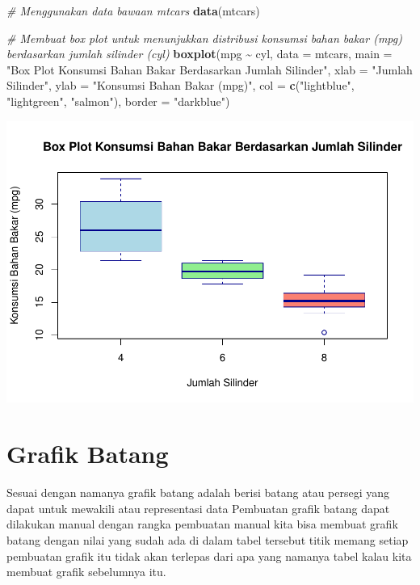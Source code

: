 \documentclass[
]{book}
\newenvironment{Shaded}{\begin{snugshade}}{\end{snugshade}}
\newcommand{\AttributeTok}[1]{\textcolor[rgb]{0.13,0.29,0.53}{#1}}
\newcommand{\CommentTok}[1]{\textcolor[rgb]{0.56,0.35,0.01}{\textit{#1}}}
\newcommand{\FunctionTok}[1]{\textcolor[rgb]{0.13,0.29,0.53}{\textbf{#1}}}
\newcommand{\NormalTok}[1]{#1}
\newcommand{\SpecialCharTok}[1]{\textcolor[rgb]{0.81,0.36,0.00}{\textbf{#1}}}
\newcommand{\StringTok}[1]{\textcolor[rgb]{0.31,0.60,0.02}{#1}}
\theoremstyle{definition}
\theoremstyle{definition}
\theoremstyle{definition}
\theoremstyle{definition}
\theoremstyle{remark}
\begin{document}
\begin{Shaded}
\begin{Highlighting}[]
\CommentTok{\# Menggunakan data bawaan mtcars}
\FunctionTok{data}\NormalTok{(mtcars)}

\CommentTok{\# Membuat box plot untuk menunjukkan distribusi konsumsi bahan bakar (mpg) berdasarkan jumlah silinder (cyl)}
\FunctionTok{boxplot}\NormalTok{(mpg }\SpecialCharTok{\textasciitilde{}}\NormalTok{ cyl, }
        \AttributeTok{data =}\NormalTok{ mtcars, }
        \AttributeTok{main =} \StringTok{"Box Plot Konsumsi Bahan Bakar Berdasarkan Jumlah Silinder"}\NormalTok{,}
        \AttributeTok{xlab =} \StringTok{"Jumlah Silinder"}\NormalTok{,}
        \AttributeTok{ylab =} \StringTok{"Konsumsi Bahan Bakar (mpg)"}\NormalTok{,}
        \AttributeTok{col =} \FunctionTok{c}\NormalTok{(}\StringTok{"lightblue"}\NormalTok{, }\StringTok{"lightgreen"}\NormalTok{, }\StringTok{"salmon"}\NormalTok{),}
        \AttributeTok{border =} \StringTok{"darkblue"}\NormalTok{)}
\end{Highlighting}
\end{Shaded}

\includegraphics{_main_files/figure-latex/unnamed-chunk-11-1.pdf}

\hypertarget{grafik-batang}{%
\section{Grafik Batang}\label{grafik-batang}}

Sesuai dengan namanya grafik batang adalah berisi batang atau persegi yang dapat untuk mewakili atau representasi data
Pembuatan grafik batang dapat dilakukan manual dengan rangka pembuatan manual kita bisa membuat grafik batang dengan nilai yang sudah ada di dalam tabel tersebut titik memang setiap pembuatan grafik itu tidak akan terlepas dari apa yang namanya tabel kalau kita membuat grafik sebelumnya itu.
\end{document}
